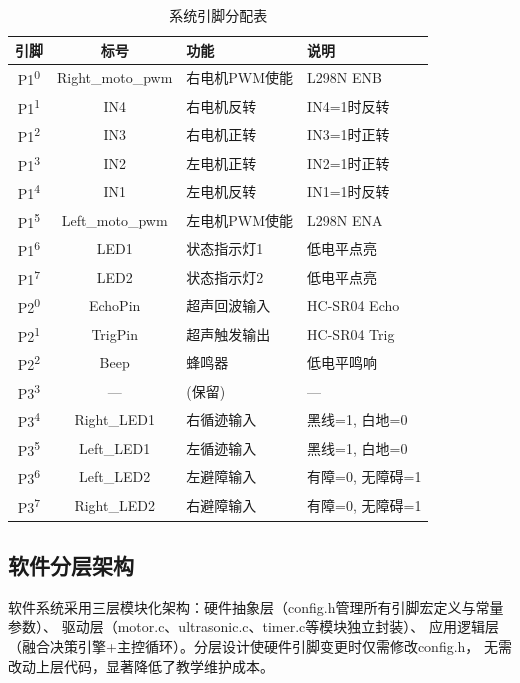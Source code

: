 \documentclass[12pt,a4paper]{ctexart}
\begin{document}
\begin{table}[H]
\centering
\caption{系统引脚分配表}
\label{tab:pins}
\small
\begin{tabular}{ccll}
\toprule
\textbf{引脚} & \textbf{标号} & \textbf{功能} & \textbf{说明} \\
\midrule
P1\textsuperscript{0} & Right\_moto\_pwm & 右电机PWM使能 & L298N ENB \\
P1\textsuperscript{1} & IN4 & 右电机反转 & IN4=1时反转 \\
P1\textsuperscript{2} & IN3 & 右电机正转 & IN3=1时正转 \\
P1\textsuperscript{3} & IN2 & 左电机正转 & IN2=1时正转 \\
P1\textsuperscript{4} & IN1 & 左电机反转 & IN1=1时反转 \\
P1\textsuperscript{5} & Left\_moto\_pwm & 左电机PWM使能 & L298N ENA \\
P1\textsuperscript{6} & LED1 & 状态指示灯1 & 低电平点亮 \\
P1\textsuperscript{7} & LED2 & 状态指示灯2 & 低电平点亮 \\
P2\textsuperscript{0} & EchoPin & 超声回波输入 & HC-SR04 Echo \\
P2\textsuperscript{1} & TrigPin & 超声触发输出 & HC-SR04 Trig \\
P2\textsuperscript{2} & Beep & 蜂鸣器 & 低电平鸣响 \\
P3\textsuperscript{3} & --- & (保留) & --- \\
P3\textsuperscript{4} & Right\_LED1 & 右循迹输入 & 黑线=1, 白地=0 \\
P3\textsuperscript{5} & Left\_LED1 & 左循迹输入 & 黑线=1, 白地=0 \\
P3\textsuperscript{6} & Left\_LED2 & 左避障输入 & 有障=0, 无障碍=1 \\
P3\textsuperscript{7} & Right\_LED2 & 右避障输入 & 有障=0, 无障碍=1 \\
\bottomrule
\end{tabular}
\end{table}

\subsection{软件分层架构}

软件系统采用三层模块化架构：硬件抽象层（config.h管理所有引脚宏定义与常量参数）、
驱动层（motor.c、ultrasonic.c、timer.c等模块独立封装）、
应用逻辑层（融合决策引擎+主控循环）。分层设计使硬件引脚变更时仅需修改config.h，
无需改动上层代码，显著降低了教学维护成本。
\end{document}

